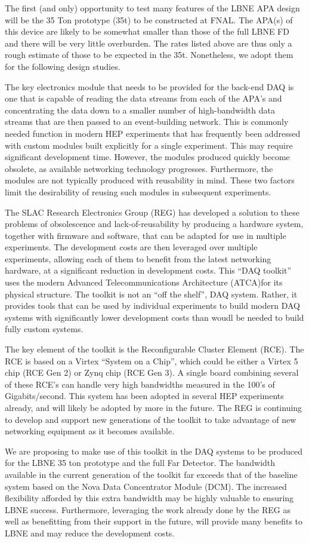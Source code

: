 The first (and only) opportunity to test many features of the LBNE APA 
design will be the 35 Ton prototype (35t) to be constructed at FNAL.
The APA(s) of this device are likely to be somewhat smaller than 
those of the full LBNE FD and there will be very little overburden.
The rates listed above are thus only a rough estimate of those to be
expected in the 35t.
Nonetheless, we adopt them for the following design studies.

The key electronics module that needs to be provided for the back-end DAQ is 
one that is capable of reading the data streams from each of the
APA's and concentrating the data down to a smaller number of high-bandwidth 
data streams that are then passed to an event-building network.
This is commonly needed function in modern HEP experiments that has frequently 
been addressed with custom modules built explicitly for a single experiment.
This may require significant development time.
However, the modules produced quickly
become obsolete, as available networking technology progresses.
Furthermore, the modules are not typically produced with reusability
in mind.
These two factors limit the desirability of reusing such modules in 
subsequent experiments.

The SLAC Research Electronics Group (REG) has developed a solution to these 
problems of obsolescence and lack-of-reusability
by producing a hardware system, together with firmware and software, that can
be adapted for use in multiple experiments.
The development costs are then leveraged over multiple experiments, allowing 
each of them to benefit from the latest networking hardware, at a significant 
reduction in development costs. 
This ``DAQ toolkit'' uses the modern Advanced Telecommunications Architecture 
(ATCA)for its physical structure.
The toolkit is not an ``off the shelf'', DAQ system.
Rather, it provides tools that can be used by individual experiments to 
build modern DAQ systems with significantly lower development costs than
woudl be needed to build fully custom systems.

The key element of the toolkit is the Reconfigurable Cluster Element (RCE).
The RCE is based on a Virtex  ``System on a Chip'', which could be 
either a Virtex 5 chip (RCE Gen 2) or Zynq chip (RCE Gen 3).
A single board combining several of these RCE's can handle very high bandwidths measured
in the 100's of Gigabits/second. 
This system has been adopted in several HEP experiments already, and will likely 
be adopted by more in the future. 
The REG is continuing to develop and support new generations 
of the toolkit to take advantage of new networking equipment as it becomes available.

We are proposing to make use of this toolkit in the DAQ systems to be produced
for the LBNE 35 ton prototype and the full Far Detector.
The bandwidth available in the current generation of the toolkit far
exceeds that of the baseline system based on the Nova Data Concentrator 
Module (DCM).
The increased flexibility afforded by this extra bandwidth may be highly valuable to 
ensuring LBNE success.
Furthermore, leveraging the work already done by the REG as well as benefitting from
their support in the future, will provide many benefits to LBNE and may reduce
the development costs.